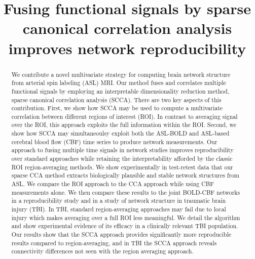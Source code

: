 \documentclass{llncs}
\title{Fusing functional signals by sparse canonical correlation analysis improves network reproducibility}
\begin{document}
\maketitle
\begin{abstract}
We contribute a novel multivariate strategy for computing brain network structure from arterial spin labeling (ASL) MRI.  Our method fuses and correlates multiple functional signals by employing an interpretable dimensionality reduction method, sparse canonical correlation analysis (SCCA).  There are two key aspects of this contribution.  First, we show how SCCA may be used to compute a multivariate correlation between different regions of interest (ROI).  In contrast to averaging signal over the ROI, this approach exploits the full information within the ROI.  Second, we show how SCCA may simultaneoulsy exploit both the ASL-BOLD and ASL-based cerebral blood flow (CBF) time series to produce network measurements.  Our approach to fusing multiple time signals in network studies improves reproducibility over standard approaches while retaining the interpretability afforded by the classic ROI region-averaging methods.  We show experimentally in test-retest data that our sparse CCA method extracts biologically plausible and stable network structures from ASL.  We compare the ROI approach to the CCA approach while using CBF measurements alone.  We then compare these results to the joint BOLD-CBF networks in a reproducibility study and in a study of network structure in traumatic brain injury (TBI).  In TBI, standard region-averaging approaches may fail due to local injury which makes averaging over a full ROI less meaningful.  We detail the algorithm and show experimental evidence of its efficacy in a clinically relevant TBI population.  Our results show that the SCCA approach provides significantly more reproducible results compared to region-averaging, and in TBI the SCCA approach reveals connectivity differences not seen with the region averaging approach.
\end{abstract}
\end{document}
